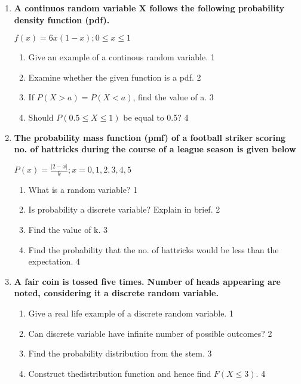 \documentclass[a4paper,oneside, margin=1.4in]{book}
\begin{document}
\begin{enumerate}
   \item
	  \textbf{A continuos random variable X follows the following probability density function (pdf).} 
	  \begin{center}
	  $f(x) = 6x(1-x); 0\le x\le 1$
  \end{center}
  
  \begin{enumerate}
    \item
	Give an example of a continous random variable. \hfill 1
    \item
	Examine whether the given function is a pdf. \hfill 2
    \item  
	If $P(X>a) = P(X<a)$, find the value of a. \hfill 3
    \item
	Should $P(0.5 \le X \le 1)$  be equal to 0.5? \hfill 4
  \end{enumerate}
  
     \item
	  \textbf{The probability mass function (pmf) of a football striker scoring no. of hattricks during the course of a league season is given below}
	  
	  \begin{center}
	  $\displaystyle P(x)  = \frac{|2-x|}{k}; x = 0, 1, 2, 3, 4, 5$
	  \end{center}
  
  \begin{enumerate}
    \item
    What is a random variable? \hfill 1
    \item
		Is probability a discrete variable? Explain in brief. \hfill 2
    \item  
	Find the value of k.  \hfill 3
    \item
	Find the probability that the no. of hattricks would be less than the expectation. \hfill 4
  \end{enumerate}
  
   \item
	  \textbf{A fair coin is tossed five times. Number of heads appearing are noted, considering it a discrete random variable.} 
  
  \begin{enumerate}
    \item
	Give a real life example of a discrete random variable. \hfill 1
    \item
	Can discrete variable have infinite number of possible outcomes? \hfill 2
    \item  
	Find the probability distribution from the stem. \hfill 3
    \item
	Construct thedistribution function and hence find $F(X \le 3)$. \hfill 4
  \end{enumerate}
  

\end{enumerate}
\end{document}
